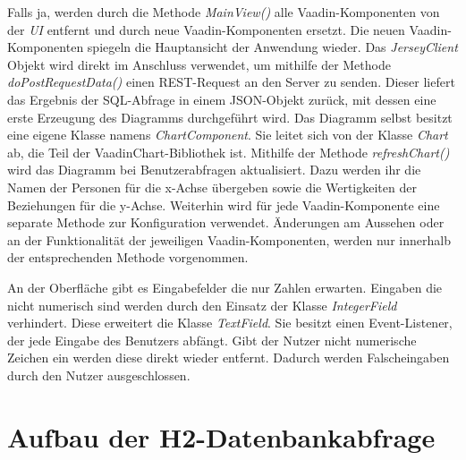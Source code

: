 Falls ja, werden durch die Methode \textit{MainView()} alle Vaadin-Komponenten von der \textit{UI} entfernt und durch neue Vaadin-Komponenten ersetzt. Die neuen Vaadin-Komponenten spiegeln die Hauptansicht der Anwendung wieder. Das \textit{JerseyClient} Objekt wird direkt im Anschluss verwendet, um mithilfe der Methode \textit{doPostRequestData()} einen REST-Request an den Server zu senden. Dieser liefert das Ergebnis der SQL-Abfrage in einem JSON-Objekt zurück, mit dessen eine erste Erzeugung des Diagramms durchgeführt wird. Das Diagramm selbst besitzt eine eigene Klasse namens \textit{ChartComponent}. Sie leitet sich von der Klasse \textit{Chart} ab, die Teil der VaadinChart-Bibliothek ist. Mithilfe der Methode \textit{refreshChart()} wird das Diagramm bei Benutzerabfragen aktualisiert. Dazu werden ihr die Namen der Personen für die x-Achse übergeben sowie die Wertigkeiten der Beziehungen für die y-Achse. Weiterhin wird für jede Vaadin-Komponente eine separate Methode zur Konfiguration verwendet. Änderungen am Aussehen oder an der Funktionalität der jeweiligen Vaadin-Komponenten, werden nur innerhalb der entsprechenden Methode vorgenommen.

An der Oberfläche gibt es Eingabefelder die nur Zahlen erwarten. Eingaben die nicht numerisch sind werden durch den Einsatz der Klasse \textit{IntegerField} verhindert. Diese erweitert die Klasse \textit{TextField}. Sie besitzt einen Event-Listener, der jede Eingabe des Benutzers abfängt. Gibt der Nutzer nicht numerische Zeichen ein werden diese direkt wieder entfernt. Dadurch werden Falscheingaben durch den Nutzer ausgeschlossen.

\section{Aufbau der H2-Datenbankabfrage}

